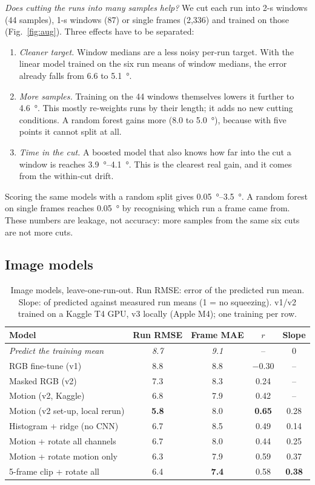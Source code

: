 \documentclass[conference,a4paper]{IEEEtran}
\begin{document}
\emph{Does cutting the runs into many samples help?}
We cut each run into 2-s windows (44 samples), 1-s windows (87) or single frames (2,336) and trained on those (Fig.~\ref{fig:aug}).
Three effects have to be separated:
\begin{enumerate}
\item \emph{Cleaner target.} Window medians are a less noisy per-run target. With the linear model trained on the six run means of window medians, the error already falls from 6.6 to \SI{5.1}{\degree}.
\item \emph{More samples.} Training on the 44 windows themselves lowers it further to \SI{4.6}{\degree}. This mostly re-weights runs by their length; it adds no new cutting conditions. A random forest gains more (8.0 to \SI{5.0}{\degree}), because with five points it cannot split at all.
\item \emph{Time in the cut.} A boosted model that also knows how far into the cut a window is reaches \SIrange{3.9}{4.1}{\degree}. This is the clearest real gain, and it comes from the within-cut drift.
\end{enumerate}
Scoring the same models with a random split gives \SIrange{0.05}{3.5}{\degree}.
A random forest on single frames reaches \SI{0.05}{\degree} by recognising which run a frame came from.
These numbers are leakage, not accuracy: more samples from the same six cuts are not more cuts.

\subsection{Image models}\label{sec:res-cnn}
\begin{table}[t]
\caption{Image models, leave-one-run-out. Run RMSE: error of the predicted run mean. Slope: of predicted against measured run means (1 = no squeezing). v1/v2 trained on a Kaggle T4 GPU, v3 locally (Apple M4); one training per row.}
\label{tab:cnn}
\centering\footnotesize
\setlength{\tabcolsep}{3.5pt}
\begin{tabular}{@{}lcccc@{}}
\toprule
Model & Run RMSE & Frame MAE & $r$ & Slope \\[-1pt]
\midrule
\emph{Predict the training mean} & \emph{8.7} & \emph{9.1} & -- & 0 \\
RGB fine-tune (v1) & 8.8 & 8.8 & $-0.30$ & -- \\
Masked RGB (v2) & 7.3 & 8.3 & 0.24 & -- \\
Motion (v2, Kaggle) & 6.8 & 7.9 & 0.42 & -- \\
Motion (v2 set-up, local rerun) & \textbf{5.8} & 8.0 & \textbf{0.65} & 0.28 \\
Histogram + ridge (no CNN) & 6.7 & 8.5 & 0.49 & 0.14 \\
Motion + rotate all channels & 6.7 & 8.0 & 0.44 & 0.25 \\
Motion + rotate motion only & 6.3 & 7.9 & 0.59 & 0.37 \\
5-frame clip + rotate all & 6.4 & \textbf{7.4} & 0.58 & \textbf{0.38} \\
\bottomrule
\end{tabular}
\end{table}
\end{document}
